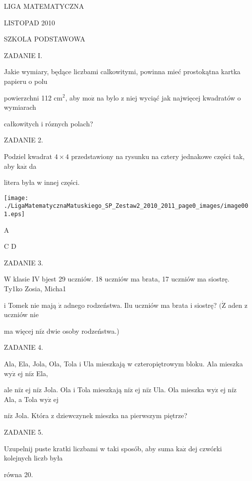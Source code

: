 \documentclass[a4paper,12pt]{article}
\begin{document}
LIGA MATEMATYCZNA

LISTOPAD 2010

SZKOLA PODSTAWOWA

ZADANIE I.

Jakie wymiary, będące liczbami calkowitymi, powinna mieć prostokątna kartka papieru o polu

powierzchni 112 $\mathrm{c}\mathrm{m}^{2}$, aby $\mathrm{m}\mathrm{o}\dot{\mathrm{z}}$ na bylo z niej wyciąć jak najwięcej kwadratów o wymiarach

całkowitych i róznych polach?

ZADANIE 2.

Podziel kwadrat $4\times 4$ przedstawiony na rysunku na cztery jednakowe części tak, aby $\mathrm{k}\mathrm{a}\dot{\mathrm{z}}$ da

litera była w innej części.
\begin{center}
\texttt{[image: ./LigaMatematycznaMatuskiego\_SP\_Zestaw2\_2010\_2011\_page0\_images/image001.eps]}
\end{center}
A

C D

ZADANIE 3.

$\mathrm{W}$ klasie IV bjest 29 uczniów. 18 uczniów ma brata, 17 uczniów ma siostrę. Ty1ko Zosia, Micha1

i Tomek nie mają $\dot{\mathrm{z}}$ adnego rodzeństwa. Ilu uczniów ma brata i siostrę? $(\dot{\mathrm{Z}}$ aden z uczniów nie

ma więcej $\mathrm{n}\mathrm{i}\dot{\mathrm{z}}$ dwie osoby rodzeństwa.)

ZADANIE 4.

Ala, Ela, Jola, Ola, Tola i Ula mieszkają w czteropiętrowym bloku. Ala mieszka $\mathrm{w}\mathrm{y}\dot{\mathrm{z}}$ ej $\mathrm{n}\mathrm{i}\dot{\mathrm{z}}$ Ela,

ale $\mathrm{n}\mathrm{i}\dot{\mathrm{z}}$ ej $\mathrm{n}\mathrm{i}\dot{\mathrm{z}}$ Jola. Ola i Tola mieszkają $\mathrm{n}\mathrm{i}\dot{\mathrm{z}}$ ej $\mathrm{n}\mathrm{i}\dot{\mathrm{z}}$ Ula. Ola mieszka $\mathrm{w}\mathrm{y}\dot{\mathrm{z}}$ ej $\mathrm{n}\mathrm{i}\dot{\mathrm{z}}$ Ala, a Tola $\mathrm{w}\mathrm{y}\dot{\mathrm{z}}$ ej

$\mathrm{n}\mathrm{i}\dot{\mathrm{z}}$ Jola. Która z dziewczynek mieszka na pierwszym piętrze?

ZADANIE 5.

Uzupelnij puste kratki liczbami w taki sposób, aby suma $\mathrm{k}\mathrm{a}\dot{\mathrm{z}}$ dej czwórki kolejnych liczb była

równa 20.
\end{document}
